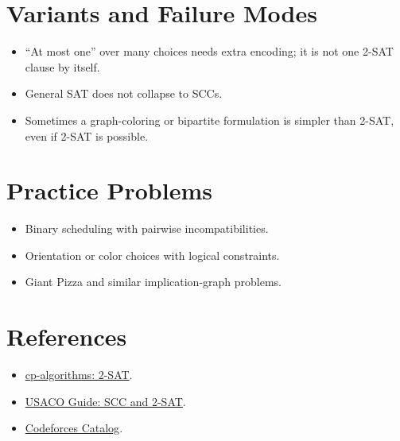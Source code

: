 \section*{Variants and Failure Modes}

\begin{itemize}
  \item ``At most one'' over many choices needs extra encoding; it is not one 2-SAT clause by itself.
  \item General SAT does not collapse to SCCs.
  \item Sometimes a graph-coloring or bipartite formulation is simpler than 2-SAT, even if 2-SAT is possible.
\end{itemize}

\section*{Practice Problems}

\begin{itemize}
  \item Binary scheduling with pairwise incompatibilities.
  \item Orientation or color choices with logical constraints.
  \item Giant Pizza and similar implication-graph problems.
\end{itemize}

\section*{References}

\begin{itemize}
  \item \href{https://cp-algorithms.com/graph/2SAT.html}{cp-algorithms: 2-SAT}.
  \item \href{https://usaco.guide/adv/SCC}{USACO Guide: SCC and 2-SAT}.
  \item \href{https://codeforces.com/catalog}{Codeforces Catalog}.
\end{itemize}

